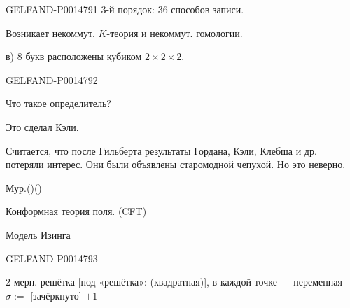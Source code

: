 \begin{GelfandAdjacentEvidence}{GELFAND-P001479}{1}
3-й порядок: 36 способов записи.

Возникает некоммут. \(K\)-теория и некоммут. гомологии.

в) 8 букв расположены кубиком \(2\times2\times2\).
\end{GelfandAdjacentEvidence}
\begin{GelfandAdjacentEvidence}{GELFAND-P001479}{2}


Что такое определитель?

Это сделал Кэли.

Считается, что после Гильберта результаты Гордана, Кэли, Клебша и др. потеряли интерес. Они были объявлены старомодной чепухой. Но это неверно.

\underline{\underline{Мур.}}\quad ()\quad ()

\underline{Конформная теория поля}. \quad (CFT)

Модель Изинга

\end{GelfandAdjacentEvidence}
\begin{GelfandAdjacentEvidence}{GELFAND-P001479}{3}


2-мерн. решётка [под «решётка»: (квадратная)], в каждой точке — переменная \(\sigma:=\) [зачёркнуто] \(\pm1\)
\end{GelfandAdjacentEvidence}
